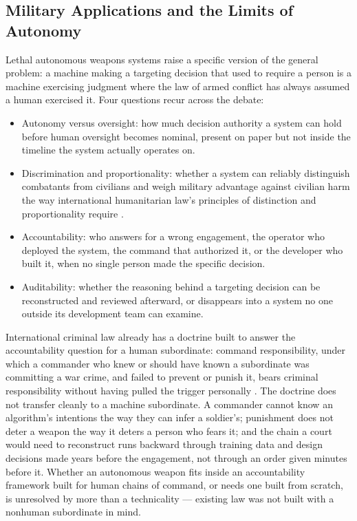 \subsection{Military Applications and the Limits of Autonomy}
\label{sec:8.7.7}
Lethal autonomous weapons systems raise a specific version of the general problem: a machine making a targeting decision that used to require a person is a machine exercising judgment where the law of armed conflict has always assumed a human exercised it. Four questions recur across the debate:

\begin{itemize}
  \item Autonomy versus oversight: how much decision authority a system can hold before human oversight becomes nominal, present on paper but not inside the timeline the system actually operates on.
  \item Discrimination and proportionality: whether a system can reliably distinguish combatants from civilians and weigh military advantage against civilian harm the way international humanitarian law's principles of distinction and proportionality require \autocite{icrc1977protocol}.
  \item Accountability: who answers for a wrong engagement, the operator who deployed the system, the command that authorized it, or the developer who built it, when no single person made the specific decision.
  \item Auditability: whether the reasoning behind a targeting decision can be reconstructed and reviewed afterward, or disappears into a system no one outside its development team can examine.
\end{itemize}
International criminal law already has a doctrine built to answer the accountability question for a human subordinate: command responsibility, under which a commander who knew or should have known a subordinate was committing a war crime, and failed to prevent or punish it, bears criminal responsibility without having pulled the trigger personally \autocite{icc1998rome}. The doctrine does not transfer cleanly to a machine subordinate. A commander cannot know an algorithm's intentions the way they can infer a soldier's; punishment does not deter a weapon the way it deters a person who fears it; and the chain a court would need to reconstruct runs backward through training data and design decisions made years before the engagement, not through an order given minutes before it. Whether an autonomous weapon fits inside an accountability framework built for human chains of command, or needs one built from scratch, is unresolved by more than a technicality — existing law was not built with a nonhuman subordinate in mind.

